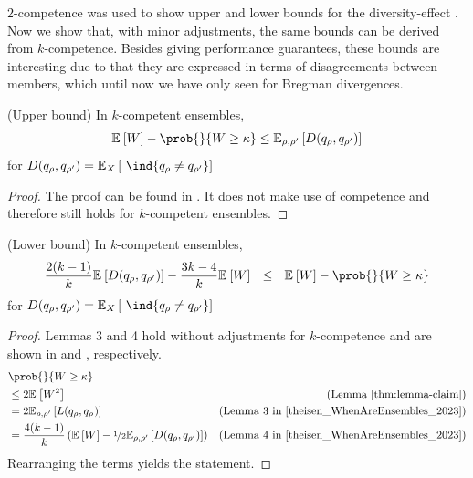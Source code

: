 \documentclass[../main.tex]{subfiles}
\begin{document}
$2$-competence was used to show upper and lower bounds for the diversity-effect \cite{theisen_WhenAreEnsembles_2023}. Now we show that, with minor adjustments, the same bounds can be derived from $k$-competence. 
Besides giving performance guarantees, these bounds are interesting due to that they are expressed in terms of disagreements between members, which until now we have only seen for Bregman divergences.

\begin{theorem} 
\label{thm:theisen-upper}
    (Upper bound) In $k$-competent ensembles,
$$
\mathbb{E}_{}\left[ W \right] - \prob{}{W \geq \kappa} \leq \mathbb{E}_{\rho, \rho'}\left[ D(q_{\rho}, q_{\rho'}) \right]  
$$
for $D(q_{\rho}, q_{\rho'}) = \mathbb{E}_{X}\left[ ~\ind{q_{\rho} \not= q_{\rho'}} \right]$
\end{theorem}
\begin{proof}
    The proof can be found in \cite{theisen_WhenAreEnsembles_2023}. It does not make use of competence and therefore still holds for $k$-competent ensembles.
\end{proof}

\begin{theorem} 
\label{thm:theisen-lower}
    (Lower bound) In $k$-competent ensembles,
$$
 \frac{2(k-1)}{k}\mathbb{E}_{}\left[ D(q_{\rho}, q_{\rho'}) \right]  - \frac{3k-4}{k}\mathbb{E}_{}\left[ W \right] 
 ~ ~ \leq ~ ~
\mathbb{E}_{}\left[ W \right] - \prob{}{W \geq \kappa} 
$$
for $D(q_{\rho}, q_{\rho'}) = \mathbb{E}_{X}\left[ ~\ind{q_{\rho} \not= q_{\rho'}} \right]$
\end{theorem}
\begin{proof}
Lemmas 3 and 4 hold without adjustments for $k$-competence and are shown in \cite{cited-by-theisen} and \cite{theisen_WhenAreEnsembles_2023}, respectively.
\begin{align*}
& \prob{}{W \geq \kappa}  \\
& \leq  2 \mathbb{E}_{}\left[ W^2 \right]  & \text{(Lemma \ref{thm:lemma-claim})}   \\
& =  2\mathbb{E}_{\rho, \rho'}\left[ L(q_{\rho}, q_{\rho_{}}) \right]  & \text{(Lemma 3 in \cite{theisen_WhenAreEnsembles_2023})} \\
& = \frac{4(k-1)}{k} \left(  \mathbb{E}_{}\left[ W  \right] - \nicefrac{1}{2} \mathbb{E}_{\rho, \rho'}\left[ D(q_{\rho}, q_{\rho'}) \right]    \right) & \text{(Lemma 4 in \cite{theisen_WhenAreEnsembles_2023})} 
\end{align*}
Rearranging the terms yields the statement.
\end{proof}
\end{document}
